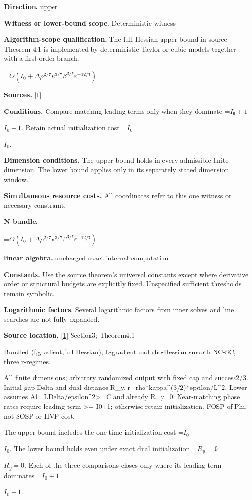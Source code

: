 \documentclass[10pt,a4paper]{article}
\newcommand{\AtlasMath}[1]{\par\begingroup\centering\setbox0=\hbox{$\displaystyle #1$}\ifdim\wd0>1.4\linewidth\typeout{ATLAS WIDE FORMULA: \the\wd0}\fi\ifdim\wd0>\linewidth\resizebox{\linewidth}{!}{\box0}\else\box0\fi\par\endgroup}
\newcommand{\AtlasInlineMath}[1]{\begingroup\setbox0=\hbox{$#1$}\ifdim\wd0>.4\linewidth\endgroup\AtlasMath{#1}\else\endgroup$#1$\fi}
\begin{document}
\textbf{Direction.} upper

\textbf{Witness or lower-bound scope.} Deterministic witness

\textbf{Algorithm-scope qualification.} The full-Hessian upper bound in source Theorem 4.1 is implemented by deterministic Taylor or cubic models together with a first-order branch.

\AtlasMath{\widetilde{O}(I_0+\Delta\rho^{2/7}\kappa^{3/7}\beta^{3/7}\varepsilon^{-12/7})}
\textbf{Sources.} \href{https://arxiv.org/pdf/2610.16771v2}{[1]}

\textbf{Conditions.} Compare matching leading terms only when they dominate \AtlasInlineMath{I_0+1}. Retain actual initialization cost \AtlasInlineMath{I_0}.

\textbf{Dimension conditions.} The upper bound holds in every admissible finite dimension. The lower bound applies only in its separately stated dimension window.

\textbf{Simultaneous resource costs.} All coordinates refer to this one witness or necessary constraint.

\textbf{N bundle.}

\AtlasMath{\widetilde O(I_0+\Delta\rho^{2/7}\kappa^{3/7}\beta^{3/7}\varepsilon^{-12/7})}
\textbf{linear algebra.} uncharged exact internal computation

\textbf{Constants.} Use the source theorem’s universal constants except where derivative order or structural budgets are explicitly fixed. Unspecified sufficient thresholds remain symbolic.

\textbf{Logarithmic factors.} Several logarithmic factors from inner solves and line searches are not fully expanded.

\textbf{Source location.} \href{https://arxiv.org/pdf/2610.16771v2}{[1]} Section3; Theorem4.1

Bundled (f,gradient,full Hessian), L-gradient and rho-Hessian smooth NC-SC; three r-regimes.

All finite dimensions; arbitrary randomized output with fixed cap and success2/3. Initial gap Delta and dual distance R\_y. r=rho*kappa\textasciicircum{}(3/2)*epsilon/L\textasciicircum{}2. Lower assumes A1=LDelta/epsilon\textasciicircum{}2>=C and already R\_y=0. Near-matching phase rates require leading term >= I0+1; otherwise retain initialization. FOSP of Phi, not SOSP or HVP cost.

The upper bound includes the one-time initialization cost \AtlasInlineMath{I_0}. The lower bound holds even under exact dual initialization \AtlasInlineMath{R_y=0}. Each of the three comparisons closes only where its leading term dominates \AtlasInlineMath{I_0+1}.
\end{document}
